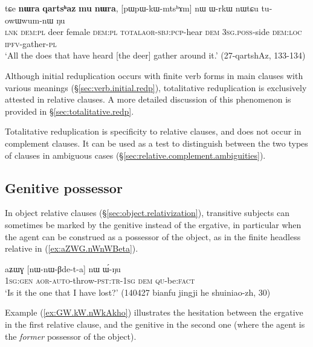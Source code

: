 \begin{exe}
\ex \label{ex:qartshaz.pWpWkWmtshAm}
\gll  tɕe \textbf{nɯra} \textbf{qartsʰaz} \textbf{mu} \textbf{nɯra},  [pɯ\redp{}pɯ-kɯ-mtsʰɤm] nɯ ɯ-rkɯ nɯtɕu tu-owɯwum-nɯ ŋu \\
\textsc{lnk} \textsc{dem}:\textsc{pl} deer female \textsc{dem}:\textsc{pl} \textsc{total}\redp{}\textsc{aor}-\textsc{sbj}:\textsc{pcp}-hear \textsc{dem} \textsc{3sg}.\textsc{poss}-side \textsc{dem}:\textsc{loc} \textsc{ipfv}-gather-\textsc{pl} \\
\glt `All the does that have heard [the deer] gather around it.' (27-qartshAz, 133-134)
\end{exe}


Although initial reduplication occurs with finite verb forms in main clauses with various meanings (§\ref{sec:verb.initial.redp}), totalitative reduplication is exclusively attested in relative clauses. A more detailed discussion of this phenomenon is provided in §\ref{sec:totalitative.redp}.

Totalitative reduplication is specificity to relative clauses, and does not occur in complement clauses. It can be used as a test to distinguish between the two types of clauses in ambiguous cases (§\ref{sec:relative.complement.ambiguities}).

 \subsection{Genitive possessor } \label{sec:relative.genitive.possessor.subject}
In object relative clauses (§\ref{sec:object.relativization}), transitive subjects can sometimes be marked by the genitive instead of the ergative, in particular when the agent can be construed as a possessor of the object, as in the finite headless relative in (\ref{ex:aZWG.nWnWBeta}).  

 \begin{exe}
\ex \label{ex:aZWG.nWnWBeta}
 \gll aʑɯɣ [nɯ-nɯ-βde-t-a] nɯ ɯ́-ŋu \\
 \textsc{1sg}:\textsc{gen} \textsc{aor}-\textsc{auto}-throw-\textsc{pst}:\textsc{tr}-\textsc{1sg} \textsc{dem} \textsc{qu}-be:\textsc{fact} \\
 \glt `Is it the one that I have lost?' (140427 bianfu jingji he shuiniao-zh, 30)
\end{exe}

Example (\ref{ex:GW.kW.nWkAkho}) illustrates the hesitation between the ergative in the first relative clause, and the genitive in the second one (where the agent is the \textit{former} possessor of the object).

